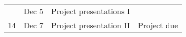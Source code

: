 \begin{table}[]
\begin{tabular}{|c|c|c|c|}
                         & Dec 5   & Project presentations I                                                                                                     &                                                                         \\ \cline{2-3}
    \multirow{-2}{*}{14} & Dec 7   & Project presentation II                                                                                                     & \multirow{-2}{*}{Project due}                                           \\ \hline
    \end{tabular}
\end{table}